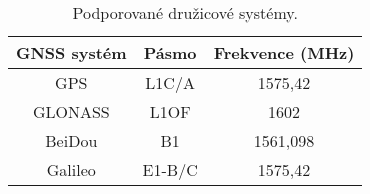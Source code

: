 \begin{table}[h!]
\caption{Podporované družicové systémy. \cite{DLQg9bT6V1GWKhxh} }
\centering
\begin{tabular}{c|c c }

GNSS systém & Pásmo & Frekvence (MHz) \\ 
\hline 
\hline
GPS & L1C/A & 1575,42 \\ 

GLONASS & L1OF & 1602 \\ 

BeiDou & B1 & 1561,098 \\ 

Galileo & E1-B/C & 1575,42 \\ 

\end{tabular} 

\label{table:gnssBands}
\end{table} 
